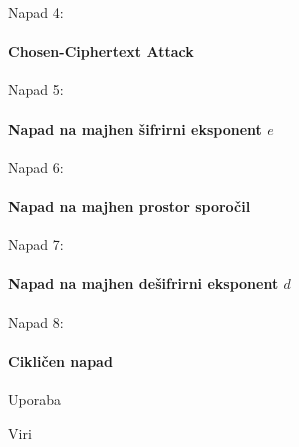 \documentclass[a4paper, 12pt]{beamer} %
\begin{document}
\begin{frame}{Napad 4:}
\framesubtitle{Chosen-Ciphertext Attack}
\end{frame}

\begin{frame}{Napad 5:}
 \framesubtitle{Napad na majhen šifrirni eksponent $e$}
\end{frame}

\begin{frame}{Napad 6:}
\framesubtitle{Napad na majhen prostor sporočil}
\end{frame}

\begin{frame}{Napad 7:}
\framesubtitle{Napad na majhen dešifrirni eksponent $d$}
\end{frame}

\begin{frame}{Napad 8:}
\framesubtitle{Cikličen napad}
\end{frame}

\begin{frame}{Uporaba}
\end{frame}

\begin{frame}{Viri}
\end{frame}
\end{document}
